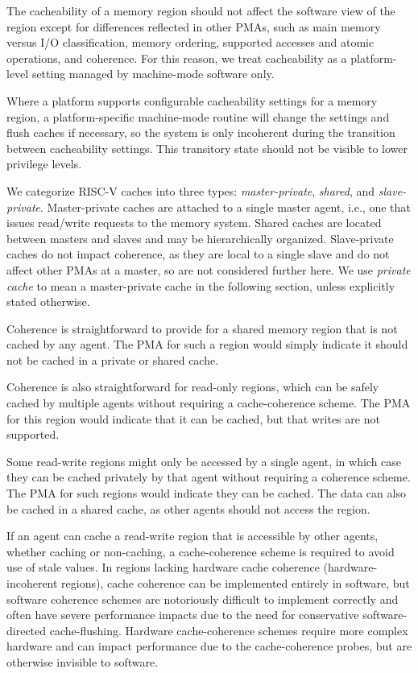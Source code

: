 The cacheability of a memory region should not affect the software
view of the region except for differences reflected in other PMAs,
such as main memory versus I/O classification, memory ordering,
supported accesses and atomic operations, and coherence.  For this
reason, we treat cacheability as a platform-level setting managed by
machine-mode software only.

Where a platform supports configurable cacheability settings for a
memory region, a platform-specific machine-mode routine will change
the settings and flush caches if necessary, so the system is only
incoherent during the transition between cacheability settings.  This
transitory state should not be visible to lower privilege levels.

\begin{commentary}
We categorize RISC-V caches into three types: {\em master-private},
{\em shared}, and {\em slave-private}.  Master-private caches are
attached to a single master agent, i.e., one that issues read/write
requests to the memory system.  Shared caches are located between
masters and slaves and may be hierarchically organized.  Slave-private
caches do not impact coherence, as they are local to a single slave
and do not affect other PMAs at a master, so are not considered
further here.  We use {\em private cache} to mean a master-private
cache in the following section, unless explicitly stated otherwise.

Coherence is straightforward to provide for a shared memory region
that is not cached by any agent.  The PMA for such a region would
simply indicate it should not be cached in a private or shared cache.

Coherence is also straightforward for read-only regions, which can be
safely cached by multiple agents without requiring a cache-coherence
scheme.  The PMA for this region would indicate that it can be cached,
but that writes are not supported.

Some read-write regions might only be accessed by a single agent, in
which case they can be cached privately by that agent without
requiring a coherence scheme.  The PMA for such regions would indicate
they can be cached.  The data can also be cached in a shared cache, as
other agents should not access the region.

If an agent can cache a read-write region that is accessible by other
agents, whether caching or non-caching, a cache-coherence scheme is
required to avoid use of stale values.  In regions lacking hardware
cache coherence (hardware-incoherent regions), cache coherence can be
implemented entirely in software, but software coherence schemes are
notoriously difficult to implement correctly and often have severe
performance impacts due to the need for conservative software-directed
cache-flushing.  Hardware cache-coherence schemes require more complex
hardware and can impact performance due to the cache-coherence probes,
but are otherwise invisible to software.


\end{commentary}
